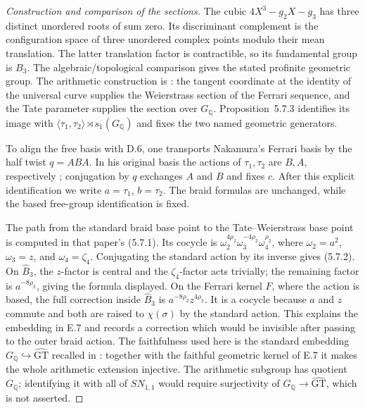 \begin{proof}[Construction and comparison of the sections]
The cubic $4X^3-g_2X-g_3$ has three distinct unordered roots of sum
zero.  Its discriminant complement is the configuration space of
three unordered complex points modulo their mean translation.
The latter translation factor is contractible, so its fundamental
group is $B_3$.  The algebraic/topological comparison gives the
stated profinite geometric group.  The arithmetic construction is
\citet[\S\S2.3--2.4, 5.2, and Proposition~5.7.3]{Nakamura2013Eisenstein}:
the tangent coordinate at the identity of the universal curve supplies
the Weierstrass section of the Ferrari sequence, and the Tate
parameter supplies the section over $G_{\mathbb Q}$.  Proposition~5.7.3
identifies its image with $\langle\tau_1,\tau_2\rangle\rtimes s_1(G_{\mathbb Q})$
and fixes the two named geometric generators.

To align the free basis with D.6, one transports Nakamura's Ferrari
basis by the half twist $q=ABA$.  In his original basis the actions
of $\tau_1,\tau_2$ are $B,A$, respectively
\citep[Proposition~5.7.3]{Nakamura2013Eisenstein}; conjugation by
$q$ exchanges $A$ and $B$ and fixes $c$.  After this explicit
identification we write $a=\tau_1$, $b=\tau_2$.  The braid formulas
are unchanged, while the based free-group identification is fixed.

The path from the standard braid base point to the Tate--Weierstrass
base point is computed in that paper's (5.7.1).  Its cocycle is
$\omega_2^{4\rho_2}\omega_3^{-4\rho_2}\omega_4^{\rho_2}$,
where $\omega_2=a^2$, $\omega_3=z$, and $\omega_4=\zeta_4$.
Conjugating the standard action by its inverse gives (5.7.2).
On $\widehat B_3$, the $z$-factor is central and the $\zeta_4$-factor
acts trivially; the remaining factor is $a^{-8\rho_2}$, giving the
formula displayed.  On the Ferrari kernel $F$, where the action is
based, the full correction inside $\widehat B_3$ is
$a^{-8\rho_2}z^{4\rho_2}$.  It is a cocycle because $a$ and $z$
commute and both are raised to $\chi(\sigma)$ by the standard action.
This explains the embedding in E.7 and records a correction which
would be invisible after passing to the outer braid action.  The
faithfulness used here is the standard embedding
$G_{\mathbb Q}\hookrightarrow\widehat{\mathrm{GT}}$
recalled in \citet[\S5.1]{Nakamura2013Eisenstein}: together with
the faithful geometric kernel of E.7 it makes the whole
arithmetic extension injective.  The
arithmetic subgroup has quotient $G_{\mathbb Q}$; identifying it with
all of $SN_{1,1}$ would require surjectivity of
$G_{\mathbb Q}\to\widehat{\mathrm{GT}}$, which is not asserted.
\end{proof}

